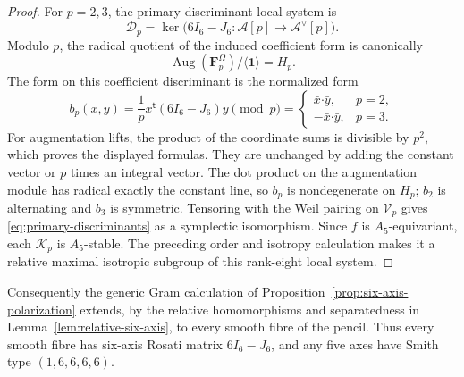 \begin{proof}
For \(p=2,3\), the primary discriminant local system is
\[
 \mathscr D_p=
 \ker\bigl(6I_6-J_6:\mathcal A[p]\longrightarrow\mathcal A^\vee[p]\bigr).
\]
Modulo \(p\), the radical quotient of the induced coefficient form is
canonically
\[
 \operatorname{Aug}(\mathbf F_p^\Omega)/\langle\mathbf1\rangle=H_p.
\]
The form on this coefficient discriminant is the normalized form
\begin{equation}
 b_p(\bar x,\bar y)
 =\frac1p x^{\mathsf t}(6I_6-J_6)y\pmod p
 =
 \begin{cases}
  \bar x\mathbin{\boldsymbol\cdot}\bar y,&p=2,\\
  -\bar x\mathbin{\boldsymbol\cdot}\bar y,&p=3.
 \end{cases}
 \label{eq:normalized-primary-pairings}
\end{equation}
For augmentation lifts, the product of the coordinate sums is divisible by
\(p^2\), which proves the displayed formulas.  They are unchanged by adding
the constant vector or \(p\) times an integral vector.  The dot product on
the augmentation module has radical exactly the constant line, so \(b_p\)
is nondegenerate on \(H_p\); \(b_2\) is alternating and \(b_3\) is symmetric.
Tensoring with the Weil pairing on \(\mathscr V_p\) gives
\eqref{eq:primary-discriminants} as a symplectic isomorphism.  Since \(f\)
is \(A_5\)-equivariant, each \(\mathscr K_p\) is \(A_5\)-stable.  The
preceding order and isotropy calculation makes it a relative maximal
isotropic subgroup of this rank-eight local system.
\end{proof}

Consequently the generic Gram calculation of
Proposition~\ref{prop:six-axis-polarization} extends, by the relative
homomorphisms and separatedness in Lemma~\ref{lem:relative-six-axis}, to
every smooth fibre of the pencil.  Thus every smooth fibre has six-axis
Rosati matrix $6I_6-J_6$, and any five axes have Smith type
$(1,6,6,6,6)$.

